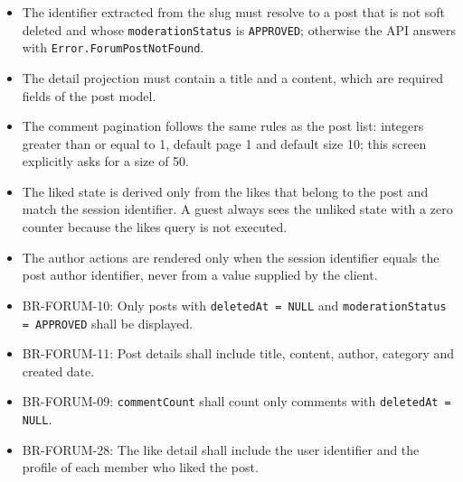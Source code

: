 \begin{itemize}[leftmargin=1.6em,topsep=3pt,itemsep=2pt,parsep=0pt,label=$\bullet$]
      \item The identifier extracted from the slug must resolve to a post that is not soft
            deleted and whose \texttt{moderationStatus} is \texttt{APPROVED}; otherwise the
            API answers with \texttt{Error.ForumPostNotFound}.
      \item The detail projection must contain a title and a content, which are required
            fields of the post model.
      \item The comment pagination follows the same rules as the post list: integers
            greater than or equal to 1, default page 1 and default size 10; this screen
            explicitly asks for a size of 50.
      \item The liked state is derived only from the likes that belong to the post and
            match the session identifier. A guest always sees the unliked state with a zero
            counter because the likes query is not executed.
      \item The author actions are rendered only when the session identifier equals the
            post author identifier, never from a value supplied by the client.
\end{itemize}

\begin{itemize}[leftmargin=1.6em,topsep=3pt,itemsep=2pt,parsep=0pt,label=$\bullet$]\brrulelist
      \item BR-FORUM-10: Only posts with \texttt{deletedAt = NULL} and
            \texttt{moderationStatus = APPROVED} shall be displayed.
      \item BR-FORUM-11: Post details shall include title, content, author, category and
            created date.
      \item BR-FORUM-09: \texttt{commentCount} shall count only comments with
            \texttt{deletedAt = NULL}.
      \item BR-FORUM-28: The like detail shall include the user identifier and the profile
            of each member who liked the post.
\end{itemize}


